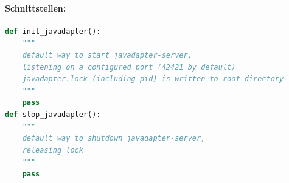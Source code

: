 \paragraph{Schnittstellen:}
\label{par:schnittstellen_}

\begin{lstlisting}[language=python]
def init_javadapter():
    """
    default way to start javadapter-server,
    listening on a configured port (42421 by default)
    javadapter.lock (including pid) is written to root directory
    """
    pass
def stop_javadapter():
    """
    default way to shutdown javadapter-server,
    releasing lock
    """
    pass
\end{lstlisting}
